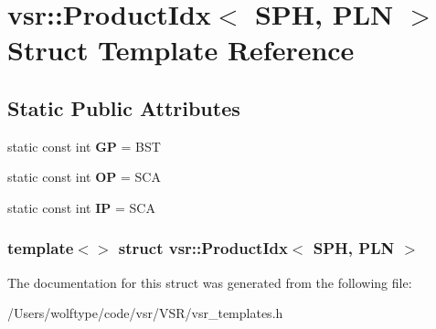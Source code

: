 \hypertarget{structvsr_1_1_product_idx_3_01_s_p_h_00_01_p_l_n_01_4}{\section{vsr\-:\-:Product\-Idx$<$ S\-P\-H, P\-L\-N $>$ Struct Template Reference}
\label{structvsr_1_1_product_idx_3_01_s_p_h_00_01_p_l_n_01_4}
}
\subsection*{Static Public Attributes}
\begin{DoxyCompactItemize}
\item 
\hypertarget{structvsr_1_1_product_idx_3_01_s_p_h_00_01_p_l_n_01_4_a98ca582b6bb2129996736d119540cc82}{static const int {\bfseries G\-P} = B\-S\-T}\label{structvsr_1_1_product_idx_3_01_s_p_h_00_01_p_l_n_01_4_a98ca582b6bb2129996736d119540cc82}

\item 
\hypertarget{structvsr_1_1_product_idx_3_01_s_p_h_00_01_p_l_n_01_4_ac200e44efa4ba9c26d2668f207ef2236}{static const int {\bfseries O\-P} = S\-C\-A}\label{structvsr_1_1_product_idx_3_01_s_p_h_00_01_p_l_n_01_4_ac200e44efa4ba9c26d2668f207ef2236}

\item 
\hypertarget{structvsr_1_1_product_idx_3_01_s_p_h_00_01_p_l_n_01_4_a517ef582596b8323063f5c435aa8eb60}{static const int {\bfseries I\-P} = S\-C\-A}\label{structvsr_1_1_product_idx_3_01_s_p_h_00_01_p_l_n_01_4_a517ef582596b8323063f5c435aa8eb60}

\end{DoxyCompactItemize}
\subsubsection*{template$<$$>$ struct vsr\-::\-Product\-Idx$<$ S\-P\-H, P\-L\-N $>$}



The documentation for this struct was generated from the following file\-:\begin{DoxyCompactItemize}
\item 
/\-Users/wolftype/code/vsr/\-V\-S\-R/vsr\-\_\-templates.\-h\end{DoxyCompactItemize}
